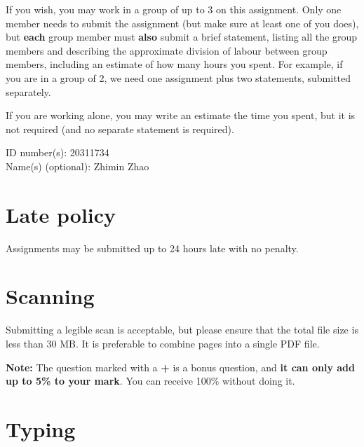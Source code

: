 \gdef\lecturenumber{a3}
\gdef\subsectioncounters{1}


\newcommand{\blanks}[1]{\ensuremath{\dashuline{\hspace{#1}}}}


\date{due: Wednesday, 22 March 2022}

If you wish, you may work in a group of up to 3 on this assignment.
Only one member needs to submit the assignment (but make sure at least one of you does),
but \textbf{each} group member must \textbf{also} submit a brief statement,
listing all the group members and describing
the approximate division of labour between group members, including an estimate of how
many hours you spent.  For example, if you are in a group of 2, we need one assignment
plus two statements, submitted separately.

If you are working alone, you may write an estimate the time you spent, but it is not required
(and no separate statement is required).

\bigskip

{\noindent ID number(s):} 20311734\\[1ex]

{\noindent Name(s) (optional):} Zhimin Zhao\\[1ex]


\section*{Late policy}

Assignments may be submitted up to 24 hours late with no penalty.


\section*{Scanning}

Submitting a legible scan is acceptable, but please ensure that the total file size is less than 30 MB.
It is preferable to combine pages into a single PDF file.

\vspace*{15ex}

\textbf{Note:} The question marked with a \textbf{+} is a bonus question,
and \textbf{it can only add up to 5\% to your mark}.
You can receive 100\% without doing it.

\clearpage


\section{Typing}

